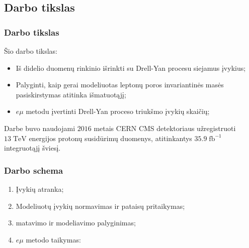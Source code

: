 \documentclass[xcolor=dvipsnames]{beamer}
\newcommand{\ltq}[1]{{\quotedblbase{}#1\textquotedblleft{}}}
\newcommand{\emu}{\mathit{e}\mu}
\begin{document}
\begin{frame}
	\section{Darbo tikslas}
	\frametitle{Darbo tikslas}
	Šio darbo tikslas:
	\begin{itemize}
		\item Iš didelio duomenų rinkinio išrinkti su Drell-Yan procesu siejamus įvykius;
		\item Palyginti, kaip gerai modeliuotas leptonų poros invariantinės masės pasiskirstymas atitinka išmatuotąjį;
		\item $\emu$ metodu įvertinti Drell-Yan proceso triukšmo įvykių skaičių;
	\end{itemize}
	\vspace{0.5cm}
	\small Darbe buvo naudojami $2016$ metais CERN CMS detektoriaus užregistruoti $13 \; \mathrm{TeV}$ energijos
	protonų susidūrimų duomenys, atitinkantys $35.9 \; \mathrm{fb}^{-1}$ integruotąjį šviesį.
\end{frame}


\begin{frame}
	\frametitle{Darbo schema}
	\begin{enumerate}
		\item Įvykių atranka;
		\item Modeliuotų įvykių normavimas ir pataisų pritaikymas;
		\item matavimo ir modeliavimo palyginimas;
		\item $\emu$ metodo taikymas:
	\end{enumerate}
\end{frame}
\end{document}
